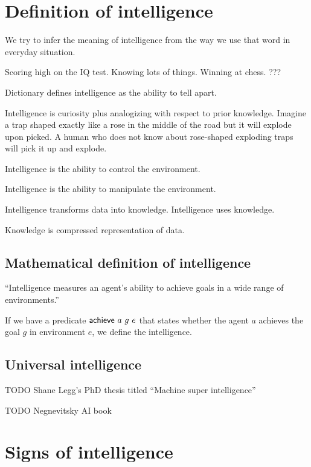 \chapter{Definition of intelligence}

We try to infer the meaning of intelligence
from the way we use that word in everyday situation.

Scoring high on the IQ test.
Knowing lots of things.
Winning at chess.
???

Dictionary defines intelligence as the ability to tell apart.

Intelligence is curiosity plus analogizing with respect to prior knowledge.
Imagine a trap shaped exactly like a rose in the middle of the road but it will explode upon picked.
A human who does not know about rose-shaped exploding traps will pick it up and explode.

Intelligence is the ability to control the environment.

Intelligence is the ability to manipulate the environment.

Intelligence transforms data into knowledge.
Intelligence uses knowledge.

Knowledge is compressed representation of data.

\section{Mathematical definition of intelligence}

``Intelligence measures an agent's ability to achieve goals in a wide range
of environments.''
\cite{LeggPhd,LeggHutterFormal}

If we have a predicate \(\textsf{achieve}~a~g~e\) that states whether the agent \(a\) achieves the goal \(g\) in environment \(e\),
we define the intelligence.

\section{Universal intelligence}

TODO Shane Legg's PhD thesis titled ``Machine super intelligence'' \cite{LeggPhd}

TODO Negnevitsky AI book \cite{negnevitsky2005artificial}

\chapter{Signs of intelligence}

